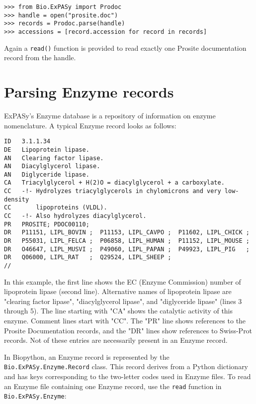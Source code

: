 \documentclass{report}
\begin{document}
\begin{verbatim}
>>> from Bio.ExPASy import Prodoc
>>> handle = open("prosite.doc")
>>> records = Prodoc.parse(handle)
>>> accessions = [record.accession for record in records]
\end{verbatim}

Again a \verb|read()| function is provided to read exactly one Prosite documentation record from the handle.

\section{Parsing Enzyme records}

ExPASy's Enzyme database is a repository of information on enzyme nomenclature. A typical Enzyme record looks as follows:

\begin{verbatim}
ID   3.1.1.34
DE   Lipoprotein lipase.
AN   Clearing factor lipase.
AN   Diacylglycerol lipase.
AN   Diglyceride lipase.
CA   Triacylglycerol + H(2)O = diacylglycerol + a carboxylate.
CC   -!- Hydrolyzes triacylglycerols in chylomicrons and very low-density
CC       lipoproteins (VLDL).
CC   -!- Also hydrolyzes diacylglycerol.
PR   PROSITE; PDOC00110;
DR   P11151, LIPL_BOVIN ;  P11153, LIPL_CAVPO ;  P11602, LIPL_CHICK ;
DR   P55031, LIPL_FELCA ;  P06858, LIPL_HUMAN ;  P11152, LIPL_MOUSE ;
DR   O46647, LIPL_MUSVI ;  P49060, LIPL_PAPAN ;  P49923, LIPL_PIG   ;
DR   Q06000, LIPL_RAT   ;  Q29524, LIPL_SHEEP ;
//
\end{verbatim}

In this example, the first line shows the EC (Enzyme Commission) number of lipoprotein lipase (second line). Alternative names of lipoprotein lipase are "clearing factor lipase", "diacylglycerol lipase", and "diglyceride lipase" (lines 3 through 5). The line starting with "CA" shows the catalytic activity of this enzyme. Comment lines start with "CC". The "PR" line shows references to the Prosite Documentation records, and the "DR" lines show references to Swiss-Prot records. Not of these entries are necessarily present in an Enzyme record.

In Biopython, an Enzyme record is represented by the \verb|Bio.ExPASy.Enzyme.Record| class. This record derives from a Python dictionary and has keys corresponding to the two-letter codes used in Enzyme files. To read an Enzyme file containing one Enzyme record, use the \verb+read+ function in \verb|Bio.ExPASy.Enzyme|:
\end{document}

